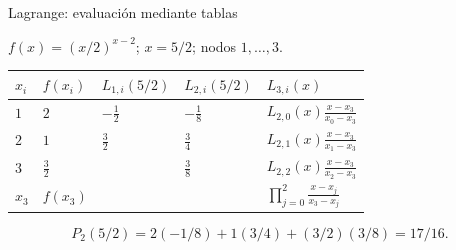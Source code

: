 \documentclass[original_version/main.tex]{subfiles}
\begin{document}
\begin{frame}[t]{Lagrange: evaluación mediante tablas}
\par\noindent\begin{minipage}[t][12mm][t]{\textwidth}\small\strut $f(x)=(x/2)^{x-2}$; $x=5/2$; nodos $1,\ldots,3$.\end{minipage}\par\nointerlineskip
\begin{minipage}[t]{\textwidth}\begingroup\scriptsize\setlength{\tabcolsep}{3pt}\begin{center}\begin{tabular}{|C{.065\textwidth}|C{.095\textwidth}|C{.19\textwidth}|C{.25\textwidth}|C{.25\textwidth}|}\hline
\rule[-2mm]{0pt}{6mm}$x_i$&$f(x_i)$&$L_{1,i}(5/2)$&$L_{2,i}(5/2)$&$L_{3,i}(x)$\\\hline
\rule[-2.5mm]{0pt}{9mm}$1$&$2$&$-\frac12$&$-\frac18$&$L_{2,0}(x)\frac{x-x_3}{x_0-x_3}$\\\hline
\rule[-2.5mm]{0pt}{9mm}$2$&$1$&$\frac32$&$\frac34$&$L_{2,1}(x)\frac{x-x_3}{x_1-x_3}$\\\hline
\rule[-2.5mm]{0pt}{9mm}$3$&$\frac{3}{2}$&&$\frac38$&$L_{2,2}(x)\frac{x-x_3}{x_2-x_3}$\\\hline
\rule[-2.5mm]{0pt}{9mm}$x_3$&$f(x_3)$&&&$\prod_{j=0}^2\frac{x-x_j}{x_3-x_j}$\\\hline
\end{tabular}\end{center}\endgroup\par
\end{minipage}\par\[P_2(5/2)=2(-1/8)+1(3/4)+(3/2)(3/8)=17/16.\]
\end{frame}
\end{document}
